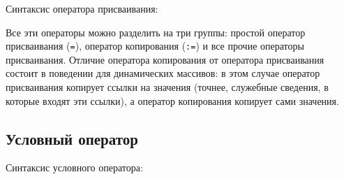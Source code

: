 \documentclass[10pt]{report}
\begin{document}
Синтаксис оператора присваивания:
\begin{center}
\textcolor{Green}{}
\end{center}

Все эти операторы можно разделить на три группы: простой оператор присваивания (\texttt{=}), оператор копирования (\texttt{:=}) и все прочие операторы присваивания.
Отличие оператора копирования от оператора присваивания состоит в поведении для динамических массивов: в этом случае оператор присваивания копирует
ссылки на значения (точнее, служебные сведения, в которые входят эти ссылки), а оператор копирования копирует сами значения. 


    \subsection{Условный оператор}
Синтаксис условного оператора:

\noindent\textcolor{Green}{}
\end{document}
